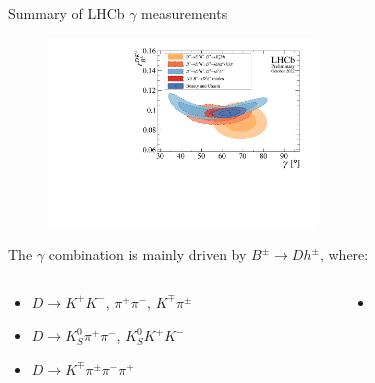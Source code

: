 \documentclass[xcolor={dvipsnames}]{beamer}
\begin{document}
\begin{frame}{Summary of LHCb \texorpdfstring{$\gamma$}{gamma} measurements}
  \begin{figure}
    \includegraphics[height=5cm]{Plots/gammacharm_lhcb_dhch_g_r_dk.pdf}
  \end{figure}
  \vspace{-0.8cm}
  \begin{center}
    The $\gamma$ combination is mainly driven by $B^\pm\to Dh^\pm$, where:
  \end{center}
  \vspace{-0.2cm}
  \begin{columns}
    \begin{column}{0.5\textwidth}
      \begin{itemize}
        \setlength\itemsep{0.5em}
        \item{$D\to K^+K^-$, $\pi^+\pi^-$, $K^\mp\pi^\pm$}
        \item{$D\to K_S^0\pi^+\pi^-$, $K_S^0K^+K^-$}
        \item{$D\to K^\mp\pi^\pm\pi^-\pi^+$}
      \end{itemize}
    \end{column}
    \begin{column}{0.5\textwidth}
      \begin{itemize}
        \item[]{}
      \end{itemize}
    \end{column}
  \end{columns}
\end{frame}
\end{document}
